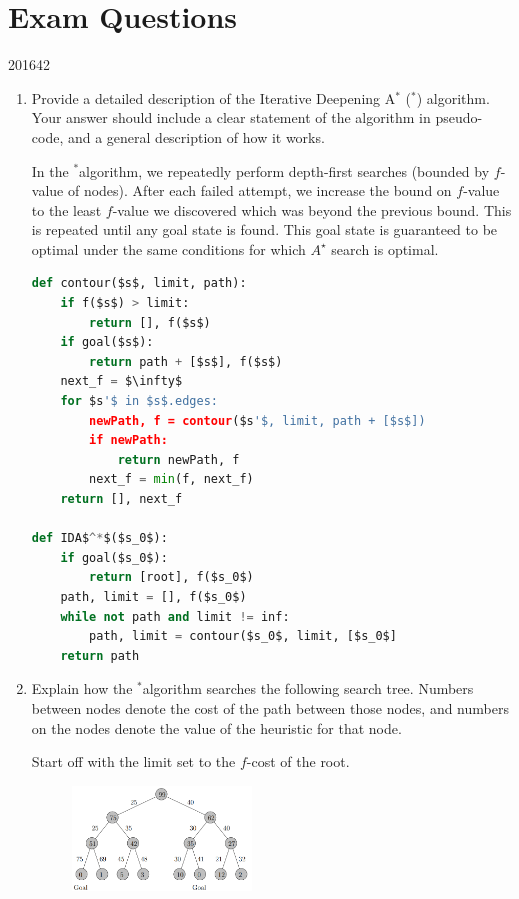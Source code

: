 \documentclass[10pt,\jkfside,a4paper]{article}
\newcommand{\idastar}{\text{IDA}\ensuremath{^*}}
\newcommand{\astar}{\ensuremath{A^\star}}
\begin{document}
\part{Exam Questions}

\setcounter{section}{0}

\begin{examquestion}{2016}{4}{2}

\begin{enumerate}[label=(\alph*)]

\item Provide a detailed description of the Iterative Deepening A$^*$
(\idastar) algorithm. Your answer should include a clear statement of the
algorithm in pseudo-code, and a general description of how it works.

In the \idastar algorithm, we repeatedly perform depth-first searches
(bounded by $f$-value of nodes). After each failed attempt, we increase the
bound on $f$-value to the least $f$-value we discovered which was beyond the
previous bound. This is repeated until any goal state is found. This goal
state is guaranteed to be optimal under the same conditions for which \astar
search is optimal.

\begin{lstlisting}[language=Python, mathescape=true]
def contour($s$, limit, path):
	if f($s$) > limit:
		return [], f($s$)
	if goal($s$):
		return path + [$s$], f($s$)
	next_f = $\infty$
	for $s'$ in $s$.edges:
		newPath, f = contour($s'$, limit, path + [$s$])
		if newPath:
			return newPath, f
		next_f = min(f, next_f)
	return [], next_f

def IDA$^*$($s_0$):
	if goal($s_0$):
		return [root], f($s_0$)
	path, limit = [], f($s_0$)
	while not path and limit != inf:
		path, limit = contour($s_0$, limit, [$s_0$]
	return path
\end{lstlisting}

\item Explain how the \idastar algorithm searches the following search tree.
Numbers between nodes denote the cost of the path between those nodes, and
numbers on the nodes denote the value of the heuristic for that node.

{\color{blue}
Start off with the limit set to the $f$-cost of the root.
}

\begin{figure}[H]
\centering
\includegraphics[width=0.45\textwidth]{searchtree}
\end{figure}


\end{enumerate}
\end{examquestion}
\end{document}
